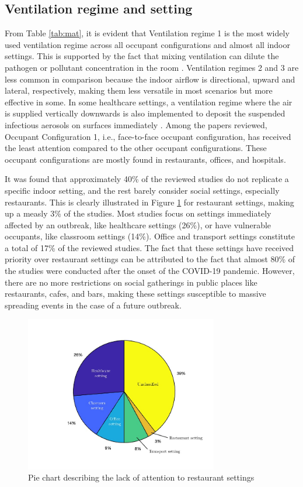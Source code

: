 \documentclass[a4paper,12pt]{elsarticle}
\begin{document}
\subsection{Ventilation regime and setting}
From Table \ref{tab:mat}, it is evident that Ventilation regime 1 is the most widely used ventilation regime across all occupant configurations and almost all indoor settings. This is supported by the fact that mixing ventilation can dilute the pathogen or pollutant concentration in the room \cite{srivastava2021effective}. Ventilation regimes 2 and 3 are less common in comparison because the indoor airflow is directional, upward and lateral, respectively, making them less versatile in most scenarios but more effective in some. In some healthcare settings, a ventilation regime where the air is supplied vertically downwards is also implemented to deposit the suspended infectious aerosols on surfaces immediately \cite{lu2022ventilation,lu2020reducing, liu2020full}. Among the papers reviewed, Occupant Configuration 1, i.e., face-to-face occupant configuration, has received the least attention compared to the other occupant configurations. These occupant configurations are mostly found in restaurants, offices, and hospitals.

It was found that approximately 40\% of the reviewed studies do not replicate a specific indoor setting, and the rest barely consider social settings, especially restaurants. This is clearly illustrated in Figure \ref{fig:pie} for restaurant settings, making up a measly 3\% of the studies. Most studies focus on settings immediately affected by an outbreak, like healthcare settings (26\%), or have vulnerable occupants, like classroom settings (14\%). Office and transport settings constitute a total of 17\% of the reviewed studies. The fact that these settings have received priority over restaurant settings can be attributed to the fact that almost 80\% of the studies were conducted after the onset of the COVID-19 pandemic. However, there are no more restrictions on social gatherings in public places like restaurants, cafes, and bars, making these settings susceptible to massive spreading events in the case of a future outbreak.

\begin{figure}[ht]
\captionsetup{font=normalsize}
    \centering
    \includegraphics[width=0.75\textwidth]{figures/pie.jpg}
    \caption{Pie chart describing the lack of attention to restaurant settings}
    \label{fig:pie}
\end{figure}
\end{document}
